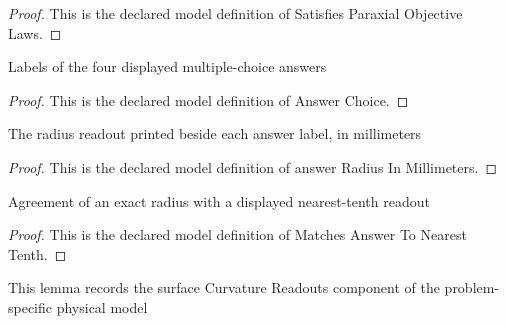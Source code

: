 \begin{proof}
  This is the declared model definition of Satisfies Paraxial Objective Laws.
\end{proof}
\begin{definition}
  \label{def:physics:phyx-mini-0057:phyxminiproblems-problemphyxmini0057-answerchoice}
  Labels of the four displayed multiple-choice answers
\end{definition}
\begin{proof}
  This is the declared model definition of Answer Choice.
\end{proof}
\begin{definition}
  \label{def:physics:phyx-mini-0057:phyxminiproblems-problemphyxmini0057-answerradiusinmillimeters}
  The radius readout printed beside each answer label, in millimeters
\end{definition}
\begin{proof}
  This is the declared model definition of answer Radius In Millimeters.
\end{proof}
\begin{definition}
  \label{def:physics:phyx-mini-0057:phyxminiproblems-problemphyxmini0057-matchesanswertonearesttenth}
  Agreement of an exact radius with a displayed nearest-tenth readout
\end{definition}
\begin{proof}
  This is the declared model definition of Matches Answer To Nearest Tenth.
\end{proof}
\begin{lemma}
  \label{lem:physics:phyx-mini-0057:phyxminiproblems-problemphyxmini0057-surfacecurvaturereadouts}
  This lemma records the surface Curvature Readouts component of the problem-specific physical model
\end{lemma}
